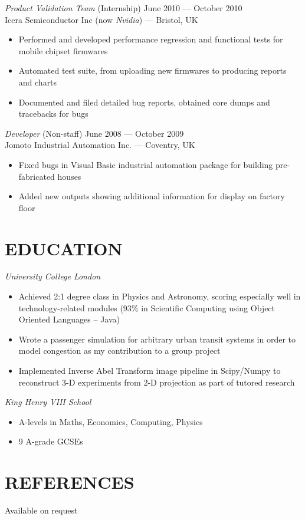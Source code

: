 \documentclass[margin, 10pt]{res}
\begin{document}
\begin{resume}
{\sl Product Validation Team} \hfill (Internship) June 2010 --- October 2010 \\
Icera Semiconductor Inc (now \textit{Nvidia}) --- Bristol, UK \\
\begin{itemize}
\item Performed and developed performance regression and functional tests for mobile chipset firmwares
\item Automated test suite, from uploading new firmwares to producing reports and charts
\item Documented and filed detailed bug reports, obtained core dumps and tracebacks for bugs
\end{itemize}

{\sl Developer} \hfill (Non-staff) June 2008 --- October 2009 \\
Jomoto Industrial Automation Inc. --- Coventry, UK \\
\begin{itemize}
\item Fixed bugs in Visual Basic industrial automation package for building pre-fabricated houses
\item Added new outputs showing additional information for display on factory floor
\end{itemize}


\section{EDUCATION}

{\sl University College London} \\
\begin{itemize} \itemsep -2pt %
\item Achieved 2:1 degree class in Physics and Astronomy, scoring especially well in technology-related modules (93\% in Scientific Computing using Object Oriented Languages -- Java)
\item Wrote a passenger simulation for arbitrary urban transit systems in order to model congestion as my contribution to a group project
\item Implemented Inverse Abel Transform image pipeline in Scipy/Numpy to reconstruct 3-D experiments from 2-D projection as part of tutored research
\end{itemize}

{\sl King Henry VIII School} \\
\begin{itemize}
\item A-levels in Maths, Economics, Computing, Physics
\item 9 A-grade GCSEs
\end{itemize}

\section{REFERENCES}
Available on request

\end{resume}
\end{document}
